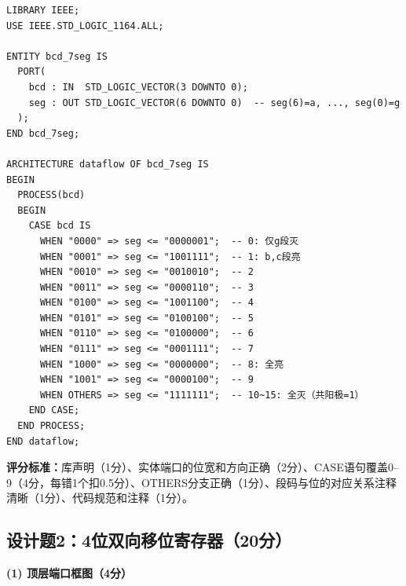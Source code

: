 \begin{lstlisting}[caption={BCD码--七段数码管译码器VHDL代码}]
LIBRARY IEEE;
USE IEEE.STD_LOGIC_1164.ALL;

ENTITY bcd_7seg IS
  PORT(
    bcd : IN  STD_LOGIC_VECTOR(3 DOWNTO 0);
    seg : OUT STD_LOGIC_VECTOR(6 DOWNTO 0)  -- seg(6)=a, ..., seg(0)=g
  );
END bcd_7seg;

ARCHITECTURE dataflow OF bcd_7seg IS
BEGIN
  PROCESS(bcd)
  BEGIN
    CASE bcd IS
      WHEN "0000" => seg <= "0000001";  -- 0: 仅g段灭
      WHEN "0001" => seg <= "1001111";  -- 1: b,c段亮
      WHEN "0010" => seg <= "0010010";  -- 2
      WHEN "0011" => seg <= "0000110";  -- 3
      WHEN "0100" => seg <= "1001100";  -- 4
      WHEN "0101" => seg <= "0100100";  -- 5
      WHEN "0110" => seg <= "0100000";  -- 6
      WHEN "0111" => seg <= "0001111";  -- 7
      WHEN "1000" => seg <= "0000000";  -- 8: 全亮
      WHEN "1001" => seg <= "0000100";  -- 9
      WHEN OTHERS => seg <= "1111111";  -- 10~15: 全灭（共阳极=1）
    END CASE;
  END PROCESS;
END dataflow;
\end{lstlisting}

\textbf{评分标准：}库声明（1分）、实体端口的位宽和方向正确（2分）、CASE语句覆盖0--9（4分，每错1个扣0.5分）、OTHERS分支正确（1分）、段码与位的对应关系注释清晰（1分）、代码规范和注释（1分）。

\subsection{设计题2：4位双向移位寄存器（20分）}

\textbf{(1) 顶层端口框图（4分）}

\begin{center}
\end{center}

